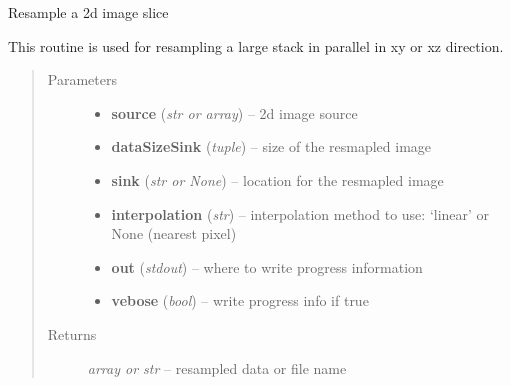 \documentclass[letterpaper,10pt,english]{sphinxmanual}
\begin{document}

\begin{fulllineitems}
\label{api/ClearMap.Alignment:ClearMap.Alignment.Resampling.resampleXY}
Resample a 2d image slice

This routine is used for resampling a large stack in parallel in xy or xz direction.
\begin{quote}\begin{description}
\item[{Parameters}] \leavevmode\begin{itemize}
\item {} 
\textbf{source} (\emph{str or array}) --
2d image source

\item {} 
\textbf{dataSizeSink} (\emph{tuple}) --
size of the resmapled image

\item {} 
\textbf{sink} (\emph{str or None}) --
location for the resmapled image

\item {} 
\textbf{interpolation} (\emph{str}) --
interpolation method to use: `linear' or None (nearest pixel)

\item {} 
\textbf{out} (\emph{stdout}) --
where to write progress information

\item {} 
\textbf{vebose} (\emph{bool}) --
write progress info if true

\end{itemize}

\item[{Returns}] \leavevmode
\emph{array or str} --
resampled data or file name

\end{description}\end{quote}

\end{fulllineitems}

\end{document}
